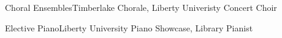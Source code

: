\documentclass{awesome-cv}
\newcommand*{\lmr}{\fontfamily{lmr}\selectfont}
\renewcommand*{\bodyfont}{\lmr}
\newcommand{\bodyfontsize}{\fontsize{11.5pt}{1em}}
\renewcommand*{\descriptionstyle}[1]{{\bodyfontsize\bodyfont\upshape\color{text} #1}}
\begin{document}

\begin{cvparagraph}
  \vspace{14pt}
  \descriptionstyle{
    \begin{cvlabeleditems}
    \item{Choral Ensembles}{Timberlake Chorale, Liberty Univeristy Concert
        Choir}
    \item{Elective Piano}{Liberty University Piano Showcase, Library Pianist}
    \end{cvlabeleditems}}
\end{cvparagraph}
\end{document}
